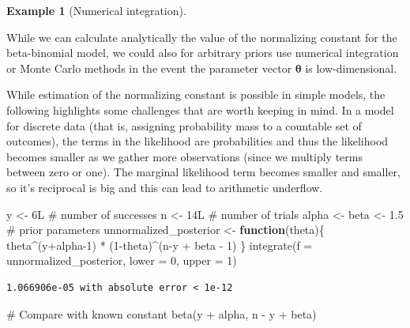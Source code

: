 \documentclass[
  11pt,
  letterpaper,
]{scrbook}
\newenvironment{Shaded}{\begin{snugshade}}{\end{snugshade}}
\newcommand{\AttributeTok}[1]{\textcolor[rgb]{0.40,0.45,0.13}{#1}}
\newcommand{\CommentTok}[1]{\textcolor[rgb]{0.37,0.37,0.37}{#1}}
\newcommand{\ControlFlowTok}[1]{\textcolor[rgb]{0.00,0.23,0.31}{\textbf{#1}}}
\newcommand{\DecValTok}[1]{\textcolor[rgb]{0.68,0.00,0.00}{#1}}
\newcommand{\FloatTok}[1]{\textcolor[rgb]{0.68,0.00,0.00}{#1}}
\newcommand{\FunctionTok}[1]{\textcolor[rgb]{0.28,0.35,0.67}{#1}}
\newcommand{\NormalTok}[1]{\textcolor[rgb]{0.00,0.23,0.31}{#1}}
\newcommand{\OtherTok}[1]{\textcolor[rgb]{0.00,0.23,0.31}{#1}}
\newcommand{\SpecialCharTok}[1]{\textcolor[rgb]{0.37,0.37,0.37}{#1}}
\theoremstyle{definition}
\newtheorem{example}{Example}[chapter]
\theoremstyle{plain}
\theoremstyle{plain}
\theoremstyle{plain}
\theoremstyle{definition}
\theoremstyle{definition}
\theoremstyle{plain}
\theoremstyle{plain}
\theoremstyle{remark}
\begin{document}
\begin{example}[Numerical
integration]\protect\hypertarget{exm-numericalintegration}{}\label{exm-numericalintegration}

While we can calculate analytically the value of the normalizing
constant for the beta-binomial model, we could also for arbitrary priors
use numerical integration or Monte Carlo methods in the event the
parameter vector \(\boldsymbol{\theta}\) is low-dimensional.

While estimation of the normalizing constant is possible in simple
models, the following highlights some challenges that are worth keeping
in mind. In a model for discrete data (that is, assigning probability
mass to a countable set of outcomes), the terms in the likelihood are
probabilities and thus the likelihood becomes smaller as we gather more
observations (since we multiply terms between zero or one). The marginal
likelihood term becomes smaller and smaller, so it's reciprocal is big
and this can lead to arithmetic underflow.

\begin{Shaded}
\begin{Highlighting}[]
\NormalTok{y }\OtherTok{\textless{}{-}} \DecValTok{6}\NormalTok{L }\CommentTok{\# number of successes }
\NormalTok{n }\OtherTok{\textless{}{-}} \DecValTok{14}\NormalTok{L }\CommentTok{\# number of trials}
\NormalTok{alpha }\OtherTok{\textless{}{-}}\NormalTok{ beta }\OtherTok{\textless{}{-}} \FloatTok{1.5} \CommentTok{\# prior parameters}
\NormalTok{unnormalized\_posterior }\OtherTok{\textless{}{-}} \ControlFlowTok{function}\NormalTok{(theta)\{}
\NormalTok{  theta}\SpecialCharTok{\^{}}\NormalTok{(y}\SpecialCharTok{+}\NormalTok{alpha}\DecValTok{{-}1}\NormalTok{) }\SpecialCharTok{*}\NormalTok{ (}\DecValTok{1}\SpecialCharTok{{-}}\NormalTok{theta)}\SpecialCharTok{\^{}}\NormalTok{(n}\SpecialCharTok{{-}}\NormalTok{y }\SpecialCharTok{+}\NormalTok{ beta }\SpecialCharTok{{-}} \DecValTok{1}\NormalTok{)}
\NormalTok{\}}
\FunctionTok{integrate}\NormalTok{(}\AttributeTok{f =}\NormalTok{ unnormalized\_posterior,}
          \AttributeTok{lower =} \DecValTok{0}\NormalTok{,}
          \AttributeTok{upper =} \DecValTok{1}\NormalTok{)}
\end{Highlighting}
\end{Shaded}

\begin{verbatim}
1.066906e-05 with absolute error < 1e-12
\end{verbatim}

\begin{Shaded}
\begin{Highlighting}[]
\CommentTok{\# Compare with known constant}
\FunctionTok{beta}\NormalTok{(y }\SpecialCharTok{+}\NormalTok{ alpha, n }\SpecialCharTok{{-}}\NormalTok{ y }\SpecialCharTok{+}\NormalTok{ beta)}
\end{Highlighting}
\end{Shaded}


\end{example}
\end{document}
